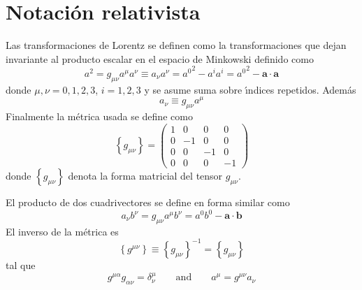 \section{Notaci\'on relativista}
\label{sec:srn}
\begin{frame}
Las transformaciones de Lorentz se definen como la transformaciones que dejan invariante al producto escalar en el espacio de Minkowski definido como
\begin{equation}
  \label{eq:146}
  a^2=g_{\mu\nu}a^\mu a^\nu\equiv a_\nu a^\nu={a^0}^2-a^i a^i={a^0}^2-\mathbf{a}\cdot\mathbf{a}
\end{equation}
donde $\mu,\nu=0,1,2,3$, $i=1,2,3$ y se asume suma sobre \'\i ndices repetidos. Adem\'as
\begin{equation}
\label{eq:149}
  a_\nu\equiv g_{\mu\nu}a^\mu
\end{equation}
 Finalmente la m\'etrica usada se define como
\begin{equation}
  \label{eq:gmunu}
  \left\{ g_{\mu\nu} \right\}=
  \begin{pmatrix}
    1&0&0&0\\
    0&-1&0&0\\
    0&0&-1&0\\
    0&0&0&-1
  \end{pmatrix}
\end{equation}
donde $\left\{ g_{\mu\nu} \right\}$ denota la forma matricial del tensor $g_{\mu\nu}$.  

El producto de dos cuadrivectores se define en forma similar como
\begin{equation}
\label{eq:157}
  a_\nu b^\nu=g_{\mu\nu}a^\mu b^\nu=a^0b^0-\mathbf{a}\cdot\mathbf{b}
\end{equation}
El inverso de la m\'etrica es
\begin{equation}
  \left\{ g^{\mu\nu} \right\}\equiv\left\{ g_{\mu\nu} \right\}^{-1}=\left\{ g_{\mu\nu} \right\}
\end{equation}
tal que
\begin{equation}
  g^{\mu\alpha}g_{\alpha\nu}=\delta^\mu_\nu\qquad\text{and}\qquad a^\mu=g^{\mu\nu}a_\nu
\end{equation}


\end{frame}
